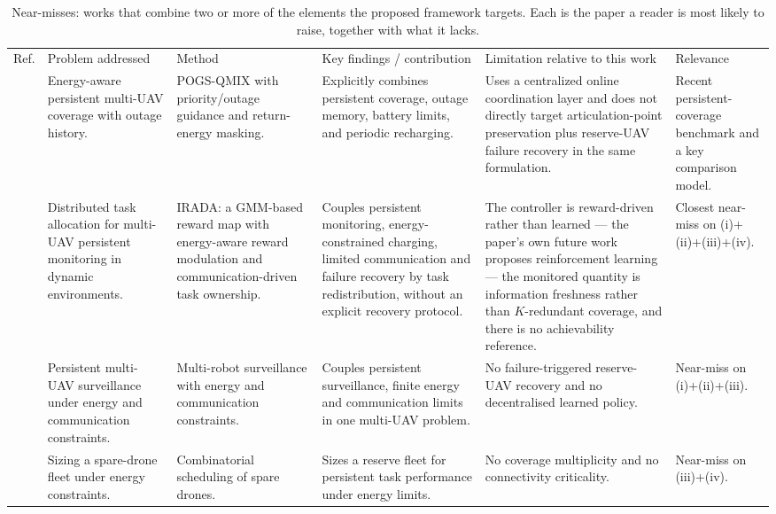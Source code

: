 \documentclass[conference]{IEEEtran}
\begin{document}
\begin{table}[t]
\caption{Near-misses: works that combine two or more of the elements the proposed framework targets. Each is the paper a reader is most likely to raise, together with what it lacks.}
\label{tab:nearmiss}
\centering
\scriptsize
\setlength{\tabcolsep}{3pt}
\renewcommand{\arraystretch}{1.08}
\begin{tabularx}{\textwidth}{@{}L{0.5cm}L{2.5cm}L{1.9cm}L{4.6cm}L{4.0cm}Y@{}}
\toprule
Ref. & Problem addressed & Method & Key findings / contribution & Limitation relative to this work & Relevance \\
\cite{mei2026} & Energy-aware persistent multi-UAV coverage with outage history. & POGS-QMIX with priority/outage guidance and return-energy masking. & Explicitly combines persistent coverage, outage memory, battery limits, and periodic recharging. & Uses a centralized online coordination layer and does not directly target articulation-point preservation plus reserve-UAV failure recovery in the same formulation. & Recent persistent-coverage benchmark and a key comparison model. \\
\cite{zhang2025} & Distributed task allocation for multi-UAV persistent monitoring in dynamic environments. & IRADA: a GMM-based reward map with energy-aware reward modulation and communication-driven task ownership. & Couples persistent monitoring, energy-constrained charging, limited communication and failure recovery by task redistribution, without an explicit recovery protocol. & The controller is reward-driven rather than learned --- the paper's own future work proposes reinforcement learning --- the monitored quantity is information freshness rather than $K$-redundant coverage, and there is no achievability reference. & Closest near-miss on (i)+(ii)+(iii)+(iv). \\
\cite{scherer2016} & Persistent multi-UAV surveillance under energy and communication constraints. & Multi-robot surveillance with energy and communication constraints. & Couples persistent surveillance, finite energy and communication limits in one multi-UAV problem. & No failure-triggered reserve-UAV recovery and no decentralised learned policy. & Near-miss on (i)+(ii)+(iii). \\
\cite{hartuv2018} & Sizing a spare-drone fleet under energy constraints. & Combinatorial scheduling of spare drones. & Sizes a reserve fleet for persistent task performance under energy limits. & No coverage multiplicity and no connectivity criticality. & Near-miss on (iii)+(iv). \\

\end{tabularx}
\end{table}
\end{document}
